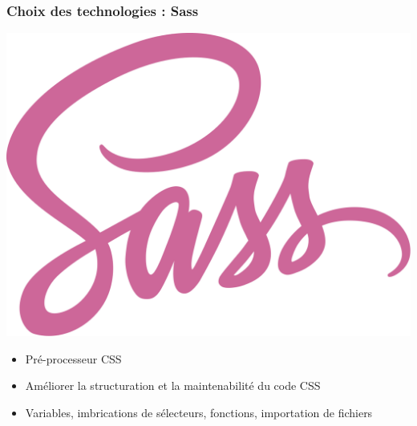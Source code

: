 \begin{frame}
    \frametitle{Choix des technologies : Sass}

    \begin{minipage}{0.48\textwidth}
        \centering
        \includegraphics[width=\linewidth]{pictures/sass.png}
    \end{minipage}
    \hfill
    \begin{minipage}{0.48\textwidth}
        \centering
	\begin{itemize}
        \item Pré-processeur CSS
	    \item Améliorer la structuration et la maintenabilité du code CSS
	    \item Variables, imbrications de sélecteurs, fonctions, importation de fichiers
	\end{itemize}
    \end{minipage}
\end{frame}

